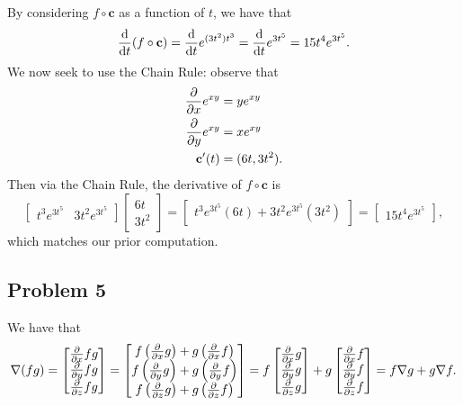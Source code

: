 \documentclass[11pt]{article}
\renewcommand{\vec}[1]{\mathbf{#1}}
\renewcommand{\grad}{\nabla}
\begin{document}
By considering $f \circ \vec{c}$ as a function of $t$, we have that
\[
	\dv{t} (f \circ \vec{c}) = \dv{t} e^{(3t^{2})t^{3}} = \dv{t} e^{3t^{5}} = 15t^{4} e^{3t^{5}}.
\]
We now seek to use the Chain Rule: observe that
\begin{align*}
	\pdv{x} e^{xy} &= y e^{xy} \\
	\pdv{y} e^{xy} &= x e^{xy} \\
	\vec{c}'(t) &= (6t, 3t^{2}).
\end{align*}
Then via the Chain Rule, the derivative of $f \circ \vec{c}$ is
\[
	\begin{bmatrix} t^{3} e^{3t^{5}} & 3t^{2}e^{3t^{5}} \end{bmatrix} \begin{bmatrix} 6t \\ 3t^{2} \end{bmatrix} = \begin{bmatrix} t^{3} e^{3t^{5}}(6t) + 3t^{2} e^{3t^{5}} (3t^{2}) \end{bmatrix} = \begin{bmatrix} 15t^{4} e^{3t^{5}} \end{bmatrix},
\]
which matches our prior computation.


\subsection{Problem 5}

We have that
\[
	\grad (fg) = \begin{bmatrix} \pdv{x} fg \\ \pdv{y} fg \\ \pdv{z} fg \end{bmatrix} = \begin{bmatrix} f \left( \pdv{x} g \right) + g \left( \pdv{x} f \right) \\ f \left( \pdv{y} g \right) + g \left( \pdv{y} f \right) \\ f \left( \pdv{z} g \right) + g \left( \pdv{z} f \right) \end{bmatrix} = f \begin{bmatrix} \pdv{x} g \\ \pdv{y} g \\ \pdv{z} g \end{bmatrix} + g \begin{bmatrix} \pdv{x} f \\ \pdv{y} f \\ \pdv{z} f \end{bmatrix} = f \grad g + g \grad f.
\]
\end{document}
